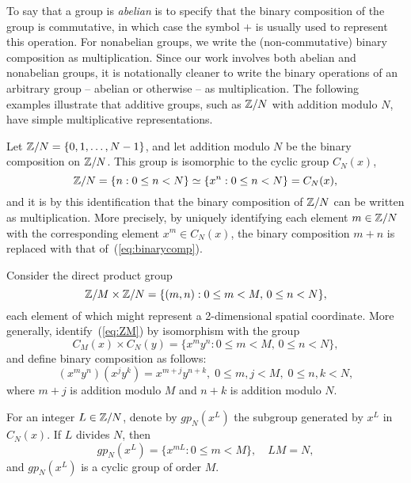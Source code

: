 To say that a group is \emph{abelian} is to specify that the binary
composition of the group is commutative, in which case the
symbol $+$ is usually used to represent this operation.
For nonabelian groups, we write the (non-commutative) binary
composition as multiplication.  Since our work involves
both abelian and nonabelian groups, it is notationally
cleaner to write the binary operations of an arbitrary group --
abelian or otherwise -- as multiplication. The
following examples illustrate that additive groups, such as $\mathbb{Z}/N$ with
addition modulo $N$, have simple multiplicative representations.
\begin{example}
\label{ex:ZN}
Let $\mathbb{Z}/N = \{0, 1, \ldots, N-1\}$,
and let addition modulo $N$ be the binary composition on $\mathbb{Z}/N$.
This group is isomorphic to the cyclic group $C_N(x)$, 
\[
\mathbb{Z}/N = \{ n : 0 \leq n < N \} \simeq \{ x^n : 0 \leq n < N\}
= C_N(x),
\]
and it is by this identification that the binary composition
of $\mathbb{Z}/N$ can be written as multiplication. 
More precisely, by uniquely identifying each element $m \in \mathbb{Z}/N$
with the corresponding element $x^m \in C_N(x)$, the binary composition
$m+n$ is replaced with that of~(\ref{eq:binarycomp}).  
\end{example}

\begin{example}
\label{ex:ZMZN}
Consider the direct product group
\begin{equation}\label{eq:ZM}
\mathbb{Z}/M \times \mathbb{Z}/N = \{(m, n) : 0 \leq m < M, \, 0 \leq n < N \},
\end{equation}
each element of which might represent a 2-dimensional spatial
coordinate. More generally, identify~(\ref{eq:ZM}) by
isomorphism with the group
\begin{equation}
  \label{eq:star}
C_{M}(x) \times C_{N}(y) = \{x^m y^n : 0 \leq m < M, \, 0 \leq n < N \},  
\end{equation}
and define binary composition as follows:
\[
(x^m y^n) (x^j y^k) = x^{m+j}y^{n+k}, \; 0\leq m, j < M,
\; 0 \leq n, k < N,
\]
where $m+j$ is addition modulo $M$ and $n+k$ is addition modulo $N$.
\end{example}

\begin{example}
For an integer $L \in \mathbb{Z}/N$, denote by $gp_N(x^L)$ the
subgroup generated by $x^L$ in $C_N(x)$. If $L$ divides $N$,
then   
\[
gp_N(x^L) = \{x^{mL} : 0\leq m < M\}, \quad LM = N,
\]
and $gp_N(x^L)$ is a cyclic group of order $M$.
\end{example}

